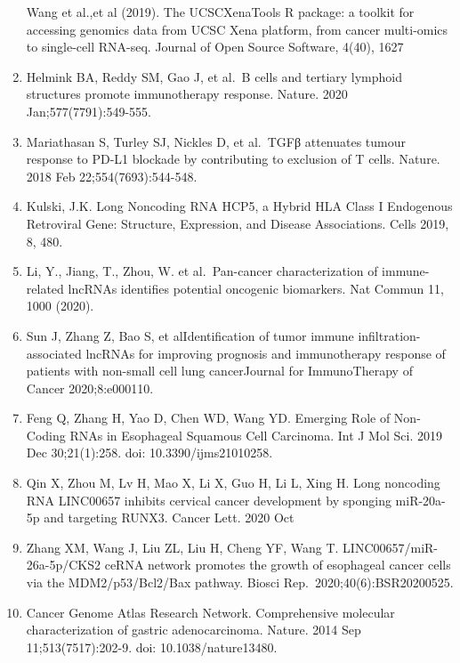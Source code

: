 \documentclass[
  12pt,
]{book}
\theoremstyle{definition}
\theoremstyle{definition}
\theoremstyle{definition}
\theoremstyle{definition}
\theoremstyle{remark}
\begin{document}
\begin{enumerate}
  Wang et al.,et al (2019). The UCSCXenaTools R package: a toolkit for accessing genomics data from UCSC Xena platform, from cancer multi-omics to single-cell RNA-seq. Journal of Open Source Software, 4(40), 1627
\item
  Helmink BA, Reddy SM, Gao J, et al.~B cells and tertiary lymphoid structures promote immunotherapy response. Nature. 2020 Jan;577(7791):549-555.
\item
  Mariathasan S, Turley SJ, Nickles D, et al.~TGFβ attenuates tumour response to PD-L1 blockade by contributing to exclusion of T cells. Nature. 2018 Feb 22;554(7693):544-548.
\item
  Kulski, J.K. Long Noncoding RNA HCP5, a Hybrid HLA Class I Endogenous Retroviral Gene: Structure, Expression, and Disease Associations. Cells 2019, 8, 480.
\item
  Li, Y., Jiang, T., Zhou, W. et al.~Pan-cancer characterization of immune-related lncRNAs identifies potential oncogenic biomarkers. Nat Commun 11, 1000 (2020).
\item
  Sun J, Zhang Z, Bao S, et alIdentification of tumor immune infiltration-associated lncRNAs for improving prognosis and immunotherapy response of patients with non-small cell lung cancerJournal for ImmunoTherapy of Cancer 2020;8:e000110.
\item
  Feng Q, Zhang H, Yao D, Chen WD, Wang YD. Emerging Role of Non-Coding RNAs in Esophageal Squamous Cell Carcinoma. Int J Mol Sci. 2019 Dec 30;21(1):258. doi: 10.3390/ijms21010258.
\item
  Qin X, Zhou M, Lv H, Mao X, Li X, Guo H, Li L, Xing H. Long noncoding RNA LINC00657 inhibits cervical cancer development by sponging miR-20a-5p and targeting RUNX3. Cancer Lett. 2020 Oct
\item
  Zhang XM, Wang J, Liu ZL, Liu H, Cheng YF, Wang T. LINC00657/miR-26a-5p/CKS2 ceRNA network promotes the growth of esophageal cancer cells via the MDM2/p53/Bcl2/Bax pathway. Biosci Rep.~2020;40(6):BSR20200525.
\item
  Cancer Genome Atlas Research Network. Comprehensive molecular characterization of gastric adenocarcinoma. Nature. 2014 Sep 11;513(7517):202-9. doi: 10.1038/nature13480.
\end{enumerate}

  
\end{document}
